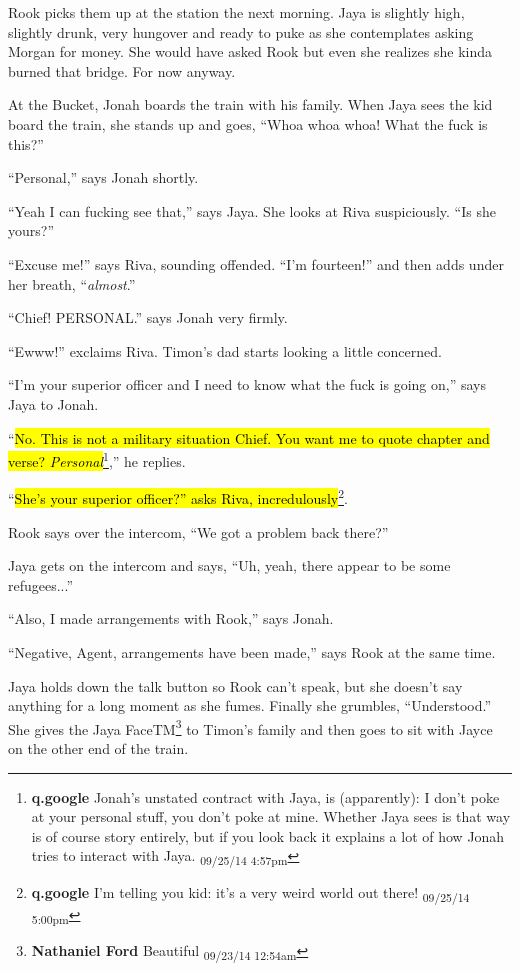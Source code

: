 Rook picks them up at the station the next morning.  Jaya is slightly high, slightly drunk, very hungover and ready to puke as she contemplates asking Morgan for money.  She would have asked Rook but even she realizes she kinda burned that bridge. For now anyway.



At the Bucket, Jonah boards the train with his family.  When Jaya sees the kid board the train, she stands up and goes, ``Whoa whoa whoa!  What the fuck is this?''

``Personal,'' says Jonah shortly.

``Yeah I can fucking see that,'' says Jaya.  She looks at Riva suspiciously.  ``Is she yours?''

``Excuse me!'' says Riva, sounding offended.  ``I'm fourteen!'' and then adds under her breath, ``\textit{almost}.''

``Chief!  PERSONAL.'' says Jonah very firmly.

``Ewww!'' exclaims Riva.  Timon's dad starts looking a little concerned.

``I'm your superior officer and I need to know what the fuck is going on,'' says Jaya to Jonah.

``\hl{No.  This is not a military situation Chief.  You want me to quote chapter and verse?  \textit{Personal}}\footnote{\textbf{q.google }Jonah's unstated contract with Jaya, is (apparently): I don't poke at your personal stuff, you don't poke at mine.  Whether Jaya sees is that way is of course story entirely, but if you look back it explains a lot of how Jonah tries to interact with Jaya. \textsubscript{09/25/14 4:57pm}},'' he replies.

``\hl{She's your superior officer?'' asks Riva, incredulously}\footnote{\textbf{q.google }I'm telling you kid: it's a very weird world out there! \textsubscript{09/25/14 5:00pm}}.

Rook says over the intercom, ``We got a problem back there?''

Jaya gets on the intercom and says, ``Uh, yeah, there appear to be some refugees...''

``Also, I made arrangements with Rook,'' says Jonah.

``Negative, Agent, arrangements have been made,'' says Rook at the same time.

Jaya holds down the talk button so Rook can't speak, but she doesn't say anything for a long moment as she fumes.  Finally she grumbles, ``Understood.''  She gives the Jaya FaceTM\footnote{\textbf{Nathaniel Ford }Beautiful \textsubscript{09/23/14 12:54am}} to Timon's family and then goes to sit with Jayce on the other end of the train.



